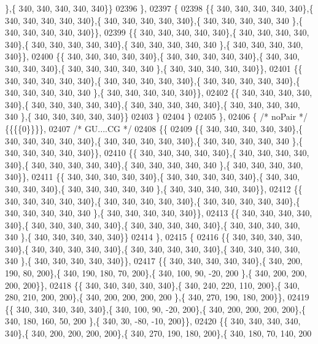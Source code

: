 \begin{DoxyCode}
      \},\{ 340, 340, 340, 340, 340\}\}
02396 \},
02397 \{
02398 \{\{ 340, 340, 340, 340, 340\},\{ 340, 340, 340, 340, 340\},\{ 340, 340, 340, 340, 340\},\{ 340, 340, 340, 340, 340
      \},\{ 340, 340, 340, 340, 340\}\},
02399 \{\{ 340, 340, 340, 340, 340\},\{ 340, 340, 340, 340, 340\},\{ 340, 340, 340, 340, 340\},\{ 340, 340, 340, 340, 340
      \},\{ 340, 340, 340, 340, 340\}\},
02400 \{\{ 340, 340, 340, 340, 340\},\{ 340, 340, 340, 340, 340\},\{ 340, 340, 340, 340, 340\},\{ 340, 340, 340, 340, 340
      \},\{ 340, 340, 340, 340, 340\}\},
02401 \{\{ 340, 340, 340, 340, 340\},\{ 340, 340, 340, 340, 340\},\{ 340, 340, 340, 340, 340\},\{ 340, 340, 340, 340, 340
      \},\{ 340, 340, 340, 340, 340\}\},
02402 \{\{ 340, 340, 340, 340, 340\},\{ 340, 340, 340, 340, 340\},\{ 340, 340, 340, 340, 340\},\{ 340, 340, 340, 340, 340
      \},\{ 340, 340, 340, 340, 340\}\}
02403 \}
02404 \}
02405 \},
02406 \{ \textcolor{comment}{/* noPair */} \{\{\{\{0\}\}\}\},
02407 \textcolor{comment}{/* GU....CG */}
02408 \{\{
02409 \{\{ 340, 340, 340, 340, 340\},\{ 340, 340, 340, 340, 340\},\{ 340, 340, 340, 340, 340\},\{ 340, 340, 340, 340, 340
      \},\{ 340, 340, 340, 340, 340\}\},
02410 \{\{ 340, 340, 340, 340, 340\},\{ 340, 340, 340, 340, 340\},\{ 340, 340, 340, 340, 340\},\{ 340, 340, 340, 340, 340
      \},\{ 340, 340, 340, 340, 340\}\},
02411 \{\{ 340, 340, 340, 340, 340\},\{ 340, 340, 340, 340, 340\},\{ 340, 340, 340, 340, 340\},\{ 340, 340, 340, 340, 340
      \},\{ 340, 340, 340, 340, 340\}\},
02412 \{\{ 340, 340, 340, 340, 340\},\{ 340, 340, 340, 340, 340\},\{ 340, 340, 340, 340, 340\},\{ 340, 340, 340, 340, 340
      \},\{ 340, 340, 340, 340, 340\}\},
02413 \{\{ 340, 340, 340, 340, 340\},\{ 340, 340, 340, 340, 340\},\{ 340, 340, 340, 340, 340\},\{ 340, 340, 340, 340, 340
      \},\{ 340, 340, 340, 340, 340\}\}
02414 \},
02415 \{
02416 \{\{ 340, 340, 340, 340, 340\},\{ 340, 340, 340, 340, 340\},\{ 340, 340, 340, 340, 340\},\{ 340, 340, 340, 340, 340
      \},\{ 340, 340, 340, 340, 340\}\},
02417 \{\{ 340, 340, 340, 340, 340\},\{ 340, 200, 190,  80, 200\},\{ 340, 190, 180,  70, 200\},\{ 340, 100,  90, -20, 200
      \},\{ 340, 200, 200, 200, 200\}\},
02418 \{\{ 340, 340, 340, 340, 340\},\{ 340, 240, 220, 110, 200\},\{ 340, 280, 210, 200, 200\},\{ 340, 200, 200, 200, 200
      \},\{ 340, 270, 190, 180, 200\}\},
02419 \{\{ 340, 340, 340, 340, 340\},\{ 340, 100,  90, -20, 200\},\{ 340, 200, 200, 200, 200\},\{ 340, 180, 160,  50, 200
      \},\{ 340,  30, -80, -10, 200\}\},
02420 \{\{ 340, 340, 340, 340, 340\},\{ 340, 200, 200, 200, 200\},\{ 340, 270, 190, 180, 200\},\{ 340, 180,  70, 140, 200

\end{DoxyCode}
